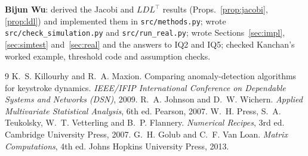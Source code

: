 \documentclass[11pt]{article}
\theoremstyle{definition}
\newcommand{\T}{^{\top}}
\begin{document}
\textbf{Bijun Wu}: derived the Jacobi and $LDL\T$ results (Props.~\ref{prop:jacobi}, \ref{prop:ldl}) and implemented them in \texttt{src/methods.py}; wrote \texttt{src/check\_simulation.py} and \texttt{src/run\_real.py}; wrote Sections~\ref{sec:impl}, \ref{sec:simtest} and~\ref{sec:real} and the answers to IQ2 and IQ5; checked Kanchan's worked example, threshold code and assumption checks.

\begin{thebibliography}{9}
 K.~S. Killourhy and R.~A. Maxion. Comparing anomaly-detection algorithms for keystroke dynamics. \emph{IEEE/IFIP International Conference on Dependable Systems and Networks (DSN)}, 2009.
 R.~A. Johnson and D.~W. Wichern. \emph{Applied Multivariate Statistical Analysis}, 6th ed. Pearson, 2007.
 W.~H. Press, S.~A. Teukolsky, W.~T. Vetterling and B.~P. Flannery. \emph{Numerical Recipes}, 3rd ed. Cambridge University Press, 2007.
 G.~H. Golub and C.~F. Van Loan. \emph{Matrix Computations}, 4th ed. Johns Hopkins University Press, 2013.
\end{thebibliography}
\end{document}
